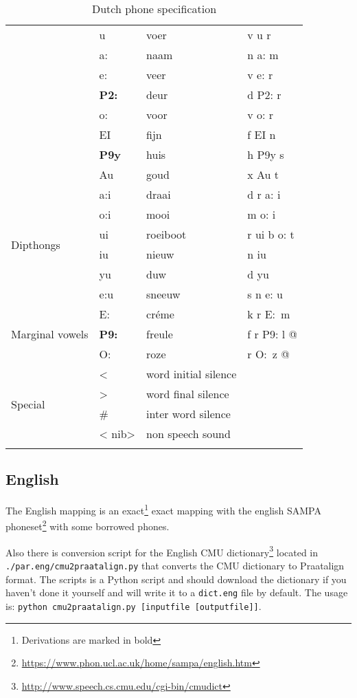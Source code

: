 {\begin{longtable}{l|l|l|l}
	& u & voer & v u r\\
	& a: & naam & n a: m\\
	& e: & veer & v e: r\\
	& \textbf{P2:} & deur & d P2: r\\
	& o: & voor & v o: r\\
	& EI & fijn & f EI n\\
	& \textbf{P9y} &huis & h P9y s\\
	& Au & goud & x Au t\\
	\midrule
	\multirow{6}{*}{Dipthongs} &
	a:i & draai & d r a: i\\
	& o:i &mooi & m o: i\\
	& ui & roeiboot & r ui b o: t\\
	& iu & nieuw & n iu\\
	& yu & duw & d yu\\
	& e:u & sneeuw & s n e: u\\
	\midrule
	\multirow{3}{*}{Marginal vowels} &
	E:\ & cr\'eme & k r E:\ m\\
	& \textbf{P9:} & freule & f r P9: l @\\
	& O:\ & roze & r O:\ z @\\
	\midrule
	\multirow{4}{*}{Special} &
	\textless{} & word initial silence & \\
	& \textgreater{} & word final silence & \\
	& \# & inter word silence & \\
	& \textless{} nib\textgreater{} & non speech sound & \\
	\bottomrule
	\caption{Dutch phone specification}
\end{longtable}
}

\subsection{English}
The English mapping is an exact\footnote{Derivations are marked in bold} exact
mapping with the english SAMPA phoneset\footnote{\url{
https://www.phon.ucl.ac.uk/home/sampa/english.htm}} with some borrowed phones.

Also there is conversion script for the English CMU
dictionary\footnote{\url{http://www.speech.cs.cmu.edu/cgi-bin/cmudict}} located
in \texttt{./par.eng/cmu2praatalign.py} that converts the CMU dictionary to
Praatalign format. The scripts is a Python script and should download the
dictionary if you haven't done it yourself and will write it to a
\texttt{dict.eng} file by default. The usage is: \texttt{python
cmu2praatalign.py [inputfile [outputfile]]}.

